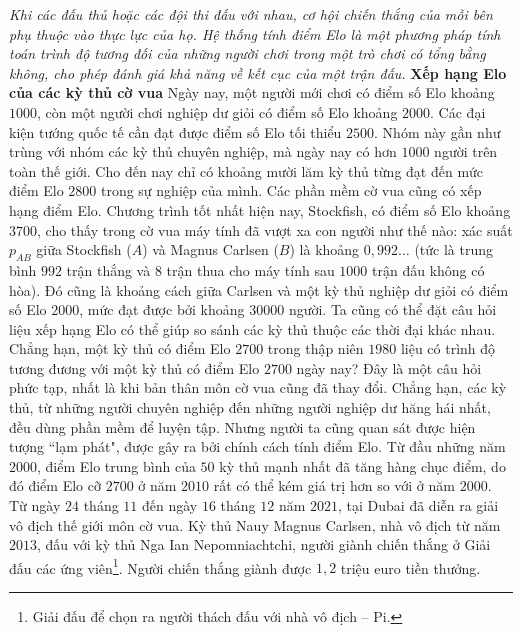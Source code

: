 \vspace*{200pt}

\begin{multicols}{2}
	\textit{Khi các đấu thủ hoặc các đội thi đấu với nhau, cơ hội chiến thắng của mỗi bên phụ thuộc vào thực lực của họ. Hệ thống tính điểm Elo là một phương pháp tính toán trình độ tương đối của những người chơi trong một trò chơi có tổng bằng không, cho phép đánh giá khả năng về kết cục của một trận đấu.}
	\vskip 0.05cm
	\textbf{\color{toanhocdoisong}Xếp hạng Elo của các kỳ thủ cờ vua}
	\vskip 0.05cm
	Ngày nay, một người mới chơi có điểm số Elo khoảng $1000$, còn một người chơi nghiệp dư giỏi có điểm số Elo khoảng $2000$. Các đại kiện tướng quốc tế cần đạt được điểm số Elo tối thiểu $2500$. Nhóm này gần như trùng với nhóm các kỳ thủ chuyên nghiệp, mà ngày nay có hơn $1000$ người trên toàn thế giới. Cho đến nay chỉ có khoảng mười lăm kỳ thủ từng đạt đến mức điểm Elo $2800$ trong sự nghiệp của mình.
	\vskip 0.05cm
	Các phần mềm cờ vua cũng có xếp hạng điểm Elo. Chương trình tốt nhất hiện nay, Stockfish, có điểm số Elo khoảng $3700$, cho thấy trong cờ vua máy tính đã vượt xa con người như thế nào: xác suất $p_{AB}$ giữa Stockfish ($A$) và Magnus Carlsen ($B$) là khoảng $0{,}992\ldots$ (tức là trung bình $992$ trận thắng và $8$ trận thua cho máy tính sau $1000$ trận đấu không có hòa). Đó cũng là khoảng cách giữa Carlsen và một kỳ thủ nghiệp dư giỏi có điểm số Elo $2000$, mức đạt được bởi khoảng $30000$ người.
	\vskip 0.05cm
	Ta cũng có thể đặt câu hỏi liệu xếp hạng Elo có thể giúp so sánh các kỳ thủ thuộc các thời đại khác nhau. Chẳng hạn, một kỳ thủ có điểm Elo $2700$ trong thập niên $1980$ liệu có trình độ tương đương với một kỳ thủ có điểm Elo $2700$ ngày nay? Đây là một câu hỏi phức tạp, nhất là khi bản thân môn cờ vua cũng đã thay đổi. Chẳng hạn, các kỳ thủ, từ những người chuyên nghiệp đến những người nghiệp dư hăng hái nhất, đều dùng phần mềm để luyện tập. Nhưng người ta cũng quan sát được hiện tượng ``lạm phát", được gây ra bởi chính cách tính điểm Elo. Từ đầu những năm $2000$, điểm Elo trung bình của $50$ kỳ thủ mạnh nhất đã tăng hàng chục điểm, do đó điểm Elo cỡ $2700$ ở năm $2010$ rất có thể kém giá trị hơn so với ở năm $2000$.
	\vskip 0.05cm
	Từ ngày $24$ tháng $11$ đến ngày $16$ tháng $12$ năm $2021$, tại Dubai đã diễn ra giải vô địch thế giới môn cờ vua. Kỳ thủ Nauy Magnus Carlsen, nhà vô địch từ năm $2013$, đấu với kỳ thủ Nga Ian Nepomniachtchi, người giành chiến thắng ở Giải đấu các ứng viên\footnote[3]{\color{toanhocdoisong}Giải đấu để chọn ra người thách đấu với nhà vô địch -- Pi.}. Người chiến thắng giành được $1{,}2$ triệu euro tiền thưởng.

\end{multicols}
